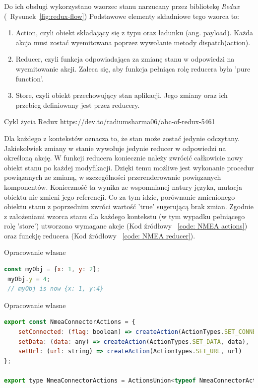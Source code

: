 \documentclass[skorowidz,skroty]{dyplomWEZUT}
\begin{document}
Do ich obsługi wykorzystano wzorzec stanu narzucany przez bibliotekę \textit{Redux} \cite{Redux, ReduxABC} (~Rysunek~\ref{fig:redux-flow}) Podstawowe elementy składniowe tego wzorca to:
\begin{enumerate}

	\item Action, czyli obiekt składający się z typu oraz ładunku (ang. payload). Każda akcja musi zostać wyemitowana poprzez wywołanie metody dispatch(action). 
	
	\item Reducer, czyli funkcja odpowiadająca za zmianę stanu w odpowiedzi na wyemitowanie akcji. Zaleca się, aby funkcja pełniąca rolę reducera była 'pure function'.  
	
	\item Store, czyli obiekt przechowujący stan aplikacji. Jego zmiany oraz ich przebieg definiowany jest przez reducery. 
	
\end{enumerate}

{Cykl życia Redux \label{fig:redux-flow}}
{https://dev.to/radiumsharma06/abc-of-redux-5461}

 Dla każdego z kontekstów oznacza to, że stan może zostać jedynie odczytany. Jakiekolwiek zmiany w stanie wywołuje jedynie reducer w odpowiedzi na określoną akcję. W funkcji reducera koniecznie należy zwrócić całkowicie nowy obiekt stanu po każdej modyfikacji. Dzięki temu możliwe jest wykonanie procedur powiązanych ze zmianą, w szczególności przerenderowanie powiązanych komponentów. Konieczność ta wynika ze wspomnianej natury języka, mutacja obiektu nie zmieni jego referencji. Co za tym idzie, porównanie zmienionego obiektu stanu z poprzednim zwróci wartość 'true' sugerującą brak zmian. Zgodnie z założeniami wzorca stanu dla każdego kontekstu (w tym wypadku pełniącego rolę 'store') utworzono wymagane akcje (Kod źródłowy ~\ref{code: NMEA actions}) oraz funckję reducera (Kod źródłowy ~\ref{code: NMEA reducer}).

{Opracowanie własne}{\label{code: js mutate}}
\begin{lstlisting}[language=JavaScript]
 const myObj = {x: 1, y: 2};
 myObj.y = 4;
 // myObj is now {x: 1, y:4}
\end{lstlisting}


{Opracowanie własne}{\label{code: NMEA actions}}
\begin{lstlisting}[language=JavaScript]
export const NmeaConnectorActions = {
    setConnected: (flag: boolean) => createAction(ActionTypes.SET_CONNECTED, flag),
    setData: (data: any) => createAction(ActionTypes.SET_DATA, data),
    setUrl: (url: string) => createAction(ActionTypes.SET_URL, url)
};

export type NmeaConnectorActions = ActionsUnion<typeof NmeaConnectorActions>;

\end{lstlisting}
\end{document}
